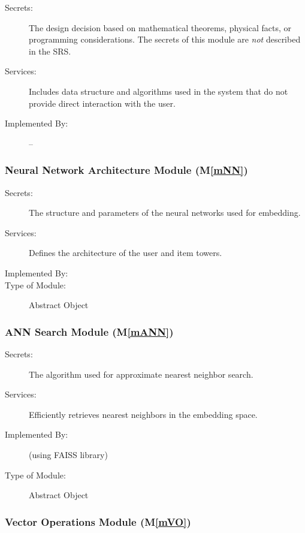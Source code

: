 \documentclass[12pt, titlepage]{article}
\newcommand{\mref}[1]{M\ref{#1}}
\begin{document}
\begin{description}
\item[Secrets:] The design decision based on mathematical theorems, physical
  facts, or programming considerations. The secrets of this module are
  \emph{not} described in the SRS.
\item[Services:] Includes data structure and algorithms used in the system that
  do not provide direct interaction with the user. 
\item[Implemented By:] --
\end{description}

\subsubsection{Neural Network Architecture Module (\mref{mNN})}

\begin{description}
\item[Secrets:]The structure and parameters of the neural networks used for embedding.
\item[Services:]Defines the architecture of the user and item towers.
\item[Implemented By:] \progname
\item[Type of Module:] Abstract Object
\end{description}

\subsubsection{ANN Search Module (\mref{mANN})}

\begin{description}
\item[Secrets:]The algorithm used for approximate nearest neighbor search.
\item[Services:]Efficiently retrieves nearest neighbors in the embedding space.
\item[Implemented By:] \progname (using FAISS library)
\item[Type of Module:] Abstract Object
\end{description}

\subsubsection{Vector Operations Module (\mref{mVO})}
\end{document}

